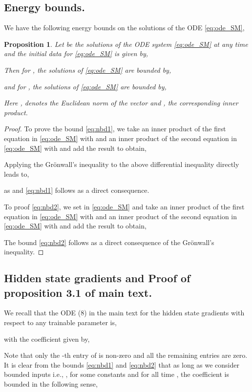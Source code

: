 \documentclass[a4paper]{article}
\newtheorem{proposition}[theorem]{Proposition}
\begin{document}
\subsection{Energy bounds.}
We have the following energy bounds on the solutions of the ODE \eqref{eq:ode_SM},
\begin{proposition}
\label{prop:n1}
Let  be the solutions of the ODE system \eqref{eq:ode_SM} at any time  and the initial data for \eqref{eq:ode_SM} is given by,

Then for , the solutions of \eqref{eq:ode_SM} are bounded by,

and for , the solutions of \eqref{eq:ode_SM} are bounded by,

Here , denotes the Euclidean norm of the vector  and , the corresponding inner product.
\end{proposition}
\begin{proof}
To prove the bound \eqref{eq:nbd1}, we take an inner product of the first equation in \eqref{eq:ode_SM} with  and an inner product of the second equation in \eqref{eq:ode_SM} with  and add the result to obtain,

Applying the Gr\"onwall's inequality to the above differential inequality directly leads to,

as  and \eqref{eq:nbd1} follows as a direct consequence.

To proof \eqref{eq:nbd2}, we set  in \eqref{eq:ode_SM} and take an inner product of the first equation in \eqref{eq:ode_SM} with  and an inner product of the second equation in \eqref{eq:ode_SM} with  and add the result to obtain,

    The bound \eqref{eq:nbd2} follows as a direct consequence of the Gr\"onwall's inequality.
\end{proof}
\subsection{Hidden state gradients and Proof of proposition 3.1 of main text.}
We recall that the ODE (8) in the main text for the hidden state gradients with respect to any trainable parameter  is,

with the coefficient  given by,

Note that only the -th entry of  is non-zero and all the remaining entries are zero. It is clear from the bounds \eqref{eq:nbd1} and \eqref{eq:nbd2} that as long as we consider bounded inputs i.e., , for some constants  and for all time , the coefficient  is bounded in the following sense,
\end{document}
